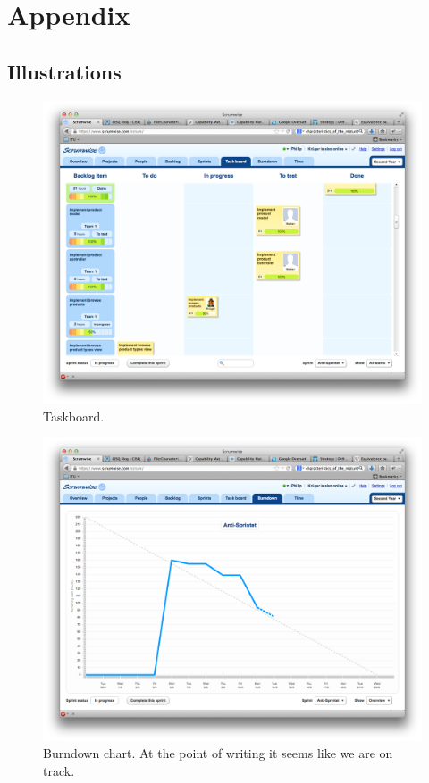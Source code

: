 \section*{Appendix}
\renewcommand*\thesubsection{\Roman{subsection}} %
\subsection{Illustrations} \label{illustrations}

\begin{figure}[H]
  \centering
  \includegraphics[width=\textwidth]{illustrations/taskboard}
  \caption{Taskboard.}
  \label{taskboard}
\end{figure}

\begin{figure}[H]
  \centering
  \includegraphics[width=\textwidth]{illustrations/burndown}
  \caption{Burndown chart. At the point of writing it seems like we are on track.}
  \label{burndown}
\end{figure}

